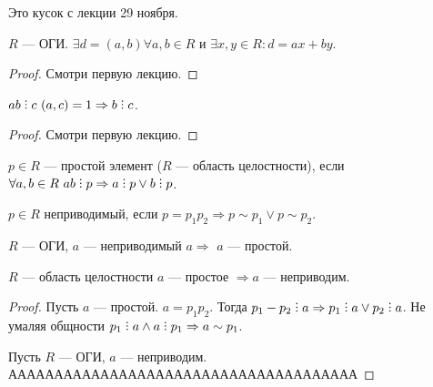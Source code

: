 Это кусок с лекции 29 ноября.
\begin{statement}
    $R$ --- ОГИ.  $\exists d = (a, b) \forall a, b \in R$ и  $\exists x, y \in R\!: d = ax+by$.
\end{statement}
\begin{proof}
    Смотри первую лекцию.
\end{proof}
\begin{statement}
    $ab \divby c\ (a, c) = 1 \Rightarrow b \divby c$.
\end{statement}
\begin{proof}
    Смотри первую лекцию.
\end{proof}
\begin{definition}
    $p \in R$ --- простой элемент ($R$ --- область целостности), если $\forall a,b \in R\ ab \divby p \Rightarrow a \divby p \lor b \divby p$.
\end{definition}
\begin{definition}
    $p \in R$ неприводимый, если  $p=p_1p_2 \Rightarrow p \sim p_1 \lor p \sim p_2$.
\end{definition}
\begin{statement}
    $R$ --- ОГИ,  $a$ --- неприводимый  $a \Rightarrow$  $a$ --- простой.

     $R$ --- область целостности  $a$ --- простое  $\Rightarrow a$ --- неприводим.
\end{statement}
\begin{proof}
    Пусть $a$ --- простой.  $a = p_1 p_2$. Тогда $p_1 - p_2 \divby a \Rightarrow p_1 \divby a \lor p_2 \divby a$.  Не умаляя общности $p_1 \divby a \land a \divby p_1 \Rightarrow a \sim p_1$. 

    Пусть $R$ --- ОГИ,  $a$ --- неприводим. АААААААААААААААААААААААААААААААААААААА
\end{proof}

